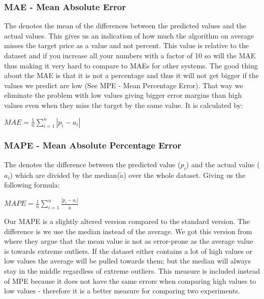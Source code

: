 \subsubsection{MAE - Mean Absolute Error}
\label{sec:maeStatistics}
The  denotes the mean of the differences between the predicted values and the actual values. This gives us an indication of how much the algorithm on average misses the target price as a value and not percent. This value is relative to the dataset and if you increase all your numbers with a factor of 10 so will the MAE thus making it very hard to compare to MAEs for other systems. The good thing about the MAE is that it is not a percentage and thus it will not get bigger if the values we predict are low (See MPE - Mean Percentage Error). That way we eliminate the problem with low values giving bigger error margins than high values even when they miss the target by the same value. It is calculated by:

\begin{center}
$MAE = \frac{1}{n}\sum_{i=1}^{n}|p_i-a_i|$
\end{center}


\subsubsection{MAPE - Mean Absolute Percentage Error}
The  denotes the difference between the predicted value ($p_i$) and the actual value ($a_i$) which are divided by the median($\tilde{a}$) over the whole dataset. Giving us the following formula:


\begin{center}
$MAPE = \frac{1}{n}\sum_{i=1}^{n}\frac{|p_i-a_i|}{\tilde{a}}$
\end{center}

\noindent Our MAPE is a slightly altered version compared to the standard version. The difference is we use the median instead of the average. We got this version from \cite{yamin2004adaptive} where they argue that the mean value is not as error-prone as the average value is towards extreme outliers. If the dataset either contains a lot of high values or low values the average will be pulled towards them; but the median will always stay in the middle regardless of extreme outliers. This measure is included instead of MPE because it does not have the same errors when comparing high values to low values - therefore it is a better measure for comparing two experiments.

